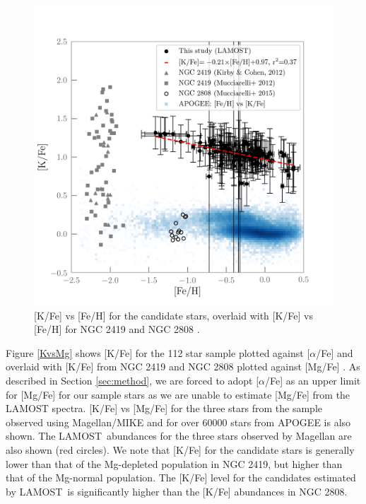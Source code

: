 \documentclass[a4paper,fleqn,usenatbib]{mnras}
\newcommand{\project}[1]{#1}
\newcommand{\lamost}{\project{LAMOST}}
\begin{document}
\begin{figure}
	\includegraphics[width=\columnwidth]{KvsFe.png}
    \caption{[K/Fe] vs [Fe/H] for the candidate stars, overlaid with [K/Fe] vs [Fe/H] for NGC 2419 and NGC 2808 \citep{cohenkirby2012, mucciarelli2012, mucciarelli2015}.}
    \label{KvsFe}
\end{figure}

Figure \ref{KvsMg} shows [K/Fe]  for the 112 star sample plotted against $[\alpha$/Fe] and overlaid with [K/Fe] from NGC 2419 and NGC 2808 plotted against [Mg/Fe] \citep{cohenkirby2012, mucciarelli2012, mucciarelli2015}. As described in Section \ref{sec:method}, we are forced to adopt [$\alpha$/Fe] as an upper limit for [Mg/Fe] for our sample stars as we are unable to estimate [Mg/Fe] from the LAMOST spectra. [K/Fe] vs [Mg/Fe] for the three stars from the sample observed using Magellan/MIKE and for over 60000 stars from APOGEE \citep{alam2015} is also shown. The \lamost\ abundances for the three stars observed by Magellan are also shown (red circles). We note that [K/Fe] for the candidate stars is generally lower than that of the Mg-depleted population in NGC 2419, but higher than that of the Mg-normal population. The [K/Fe] level for the candidates estimated by \lamost\ is significantly higher than the [K/Fe] abundances in NGC 2808.
\end{document}
